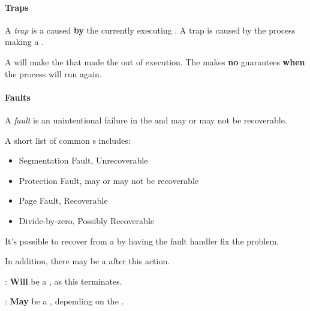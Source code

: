 \paragraph{Traps}\label{par:Traps}
\begin{definition}[Trap]\label{def:Trap}
  A \emph{trap} is a  caused \textbf{by} the currently executing .
  A trap is caused by the process making a .

  \begin{remark}\label{rmk:Trap_Scheduling}
    A  will make the  that made the   out of execution.
    The  makes \textbf{no} guarantees \textbf{when} the process will run again.
  \end{remark}
\end{definition}

\paragraph{Faults}\label{par:Faults}
\begin{definition}[Fault]\label{def:Fault}
  A \emph{fault} is an unintentional failure in the  and may or may not be recoverable.
\end{definition}

A short list of common s includes:
\begin{itemize}[noitemsep]
\item Segmentation Fault, Unrecoverable
\item Protection Fault, may or may not be recoverable
\item Page Fault, Recoverable
\item Divide-by-zero, Possibly Recoverable
\end{itemize}

It's possible to recover from a  by having the fault handler fix the problem.

In addition, there may be a  after this action.
\begin{description}[noitemsep]
\item[Unrecoverable]: \textbf{Will} be a , as this  terminates.
\item[Recoverable]: \textbf{May} be a , depending on the .
\end{description}

